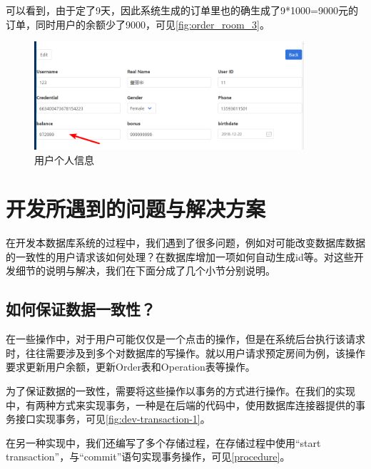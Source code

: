 \documentclass{myreport}
\begin{document}
可以看到，由于定了9天，因此系统生成的订单里也的确生成了9*1000=9000元的订单，同时用户的余额少了9000，可见\autoref{fig:order_room_3}。

\begin{figure}[htp]
    \centering
    \includegraphics[width=10cm]{figure/2018-12-22-15-31-59.png}
    \caption{用户个人信息}
    \label{fig:order_room_3}
\end{figure}



\chapter{开发所遇到的问题与解决方案}


在开发本数据库系统的过程中，我们遇到了很多问题，例如对可能改变数据库数据的一致性的用户请求该如何处理？在数据库增加一项如何自动生成id等。对这些开发细节的说明与解决，我们在下面分成了几个小节分别说明。

\section{如何保证数据一致性？}

在一些操作中，对于用户可能仅仅是一个点击的操作，但是在系统后台执行该请求时，往往需要涉及到多个对数据库的写操作。就以用户请求预定房间为例，该操作要求更新用户余额，更新Order表和Operation表等操作。

为了保证数据的一致性，需要将这些操作以事务的方式进行操作。在我们的实现中，有两种方式来实现事务，一种是在后端的代码中，使用数据库连接器提供的事务接口实现事务，可见\autoref{fig:dev-transaction-1}。

在另一种实现中，我们还编写了多个存储过程，在存储过程中使用“start transaction”，与“commit”语句实现事务操作，可见\autoref{procedure}。
\end{document}
